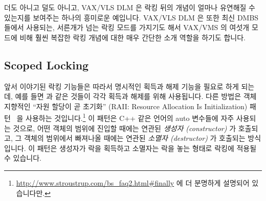 더도 아니고 덜도 아니고, VAX/VLS DLM 은 락킹 뒤의 개념이 얼마나 유연해질 수
있는지를 보여주는 하나의 흥미로운 예입니다.
VAX/VLS DLM 은 또한 최신 DMBS 들에서 사용되는, 서른개가 넘는 락킹 모드를
가지기도 해서 VAX/VMS 의 여섯개 모드에 비해 훨씬 복잡한 락킹 개념에 대한 매우
간단한 소개 역할을 하기도 합니다.

\subsection{Scoped Locking}
\label{sec:locking:Scoped Locking}

앞서 이야기된 락킹 기능들은 따라서 명시적인 획득과 해제 기능을 필요로 하게
되는데, 예를 들면  과  같은 것들이 각각
획득과 해제를 위해 사용됩니다.
다른 방법은 객체 지향적인 ``자원 할당이 곧 초기화'' (RAII: Resource Allocation
Is Initialization) 패턴~\cite{MargaretAEllis1990Cplusplus} 을 사용하는
것입니다.\footnote{
	\url{http://www.stroustrup.com/bs_faq2.html\#finally} 에 더 분명하게
	설명되어 있습니다만.}
이 패턴은 C++ 같은 언어의 auto 변수들에 자주 사용되는 것으로, 어떤 객체의
범위에 진입할 때에는 연관된 \emph{생성자 (constructor)} 가 호출되고, 그 객체의
범위에서 빠져나올 때에는 연관된 \emph{소멸자 (destructor)} 가 호출되는
방식입니다.
이 패턴은 생성자가 락을 획득하고 소멸자는 락을 놓는 형태로 락킹에 적용될 수
있습니다.


